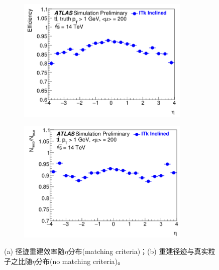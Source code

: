 \begin{figure}[h]
\centering
\begin{subfigure}[b]{0.45\textwidth}
\centering
 \includegraphics[width=0.9\textwidth]{fig/ITk_tracking_eff_tt.png}
 \caption{}
\end{subfigure}
\begin{subfigure}[b]{0.45\textwidth}
\centering
 \includegraphics[width=0.9\textwidth]{fig/ITk_tracking_eff_ratio.png}
 \caption{}
\end{subfigure}
\caption{(a) 径迹重建效率随$\eta$分布(matching criteria)；(b) 重建径迹与真实粒子之比随$\eta$分布(no matching criteria)。\cite{ATL-PHYS-PUB-2016-025}}
\label{fig:ITk_tracking_eff}
\end{figure}
